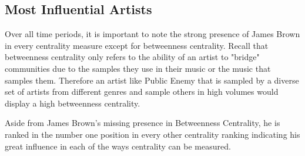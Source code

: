 \documentclass[pageno]{jpaper}
\begin{document}
\subsection{Most Influential Artists}
\begin{table}[H]
\caption{Top Artist Centralities (All Time Periods)}
\label{table:table1}
\end{table}
Over all time periods, it is important to note the strong presence of James Brown in every centrality measure except for betweenness centrality. Recall that betweenness centrality only refers to the ability of an artist to "bridge" communities due to the samples they use in their music or the music that samples them. Therefore an artist like Public Enemy that is sampled by a diverse set of artists from different genres and sample others in high volumes would display a high betweenness centrality.

Aside from James Brown's missing presence in Betweenness Centrality, he is ranked in the number one position in every other centrality ranking indicating his great influence in  each of the ways centrality can be measured. 
\end{document}
